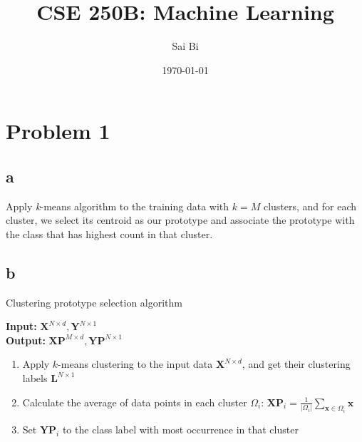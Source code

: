 \documentclass[a4paper,11pt]{article}
\theoremstyle{mytheor}
\begin{document}
\title{CSE 250B: Machine Learning}

\author{Sai Bi}

\date{\today}

\maketitle

\section*{Problem 1}
\subsection*{a} 
Apply \textit{k}-means algorithm to the training data with $k = M$ clusters, and for each cluster, we select its 
centroid as our prototype and associate the prototype with the class that has highest count in that cluster.

\subsection*{b}
{\LinesNumberedHidden
\begin{algorithm}[H]
	\DontPrintSemicolon
	\SetAlgoNoLine
	
	\caption{Clustering prototype selection algorithm}
	\textbf{Input: }{$\mathbf{X}^{N \times d}, \mathbf{Y}^{N \times 1}$} \\
	\textbf{Output: }{$\mathbf{XP}^{M \times d}, \mathbf{YP}^{N \times 1}$} \\
	\begin{enumerate}
		\item Apply $k$-means clustering to the input data $\mathbf{X}^{N \times d}$, and get their clustering labels $\mathbf{L}^{N \times 1}$ \\
		\item Calculate the average of data points in each cluster $\Omega_i$: $\mathbf{XP}_i = \frac{1}{|\Omega_i|} \sum\limits_{\mathbf{x} \in \Omega_i}{\mathbf{x}}$ \\
		\item Set $\mathbf{YP}_i$ to the class label with most occurrence in that cluster
	\end{enumerate}
\end{algorithm}
}
\end{document}
